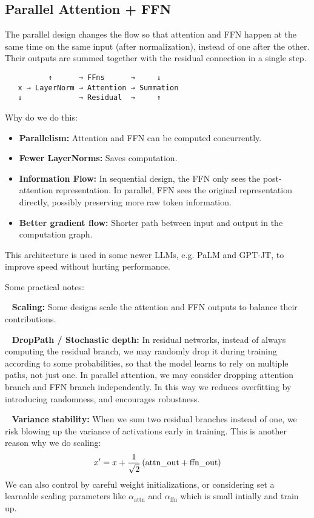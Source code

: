 \documentclass[11pt]{article}  %
\begin{document}
\subsection{Parallel Attention + FFN}
The parallel design changes the flow so that attention and FFN happen at the same time on the same input (after normalization), instead of one after the other.
Their outputs are summed together with the residual connection in a single step.
\begin{verbatim}
          ↑      → FFns      →     ↓
   x → LayerNorm → Attention → Summation
   ↓             → Residual  →     ↑
\end{verbatim}
Why do we do this:
\begin{itemize}
  \item \textbf{Parallelism:} Attention and FFN can be computed concurrently.
  \item \textbf{Fewer LayerNorms:} Saves computation.
  \item \textbf{Information Flow:} In sequential design, the FFN only sees the post-attention representation. In parallel, FFN sees the original representation directly, possibly preserving more raw token information.
  \item \textbf{Better gradient flow:} Shorter path between input and output in the computation graph.
\end{itemize}
This architecture is used in some newer LLMs, e.g. PaLM and GPT-JT, to improve speed without hurting performance.

Some practical notes:

\textbullet~ \textbf{Scaling:} Some designs scale the attention and FFN outputs to balance their contributions.
  
\textbullet~ \textbf{DropPath / Stochastic depth:} In residual networks, instead of always computing the residual branch, we may randomly drop it during training according to some probabilities, so that the model learns to rely on multiple paths, not just one.
In parallel attention, we may consider dropping attention branch and FFN branch independently. 
In this way we reduces overfitting by introducing randomness, and encourages robustness.

\textbullet~ \textbf{Variance stability:} When we sum two residual branches instead of one, we risk blowing up the variance of activations early in training. 
This is another reason why we do scaling:
\begin{align*}
  x^\prime = x + \frac{1}{\sqrt{2}}\left( \text{attn\_out} + \text{ffn\_out} \right)
\end{align*}
We can also control by careful weight initializations, or considering set a learnable scaling parameters like $\alpha_{\text{attn}}$ and $\alpha_{\text{ffn}}$ which is small intially and train up.
\end{document}
